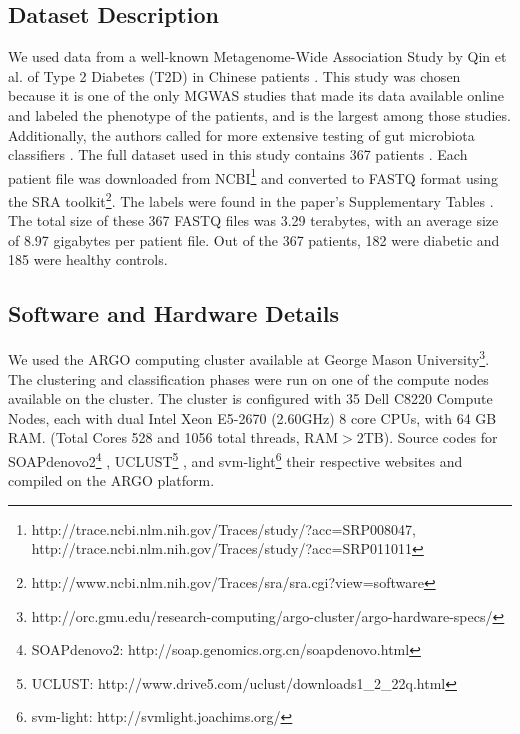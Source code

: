 \subsection{Dataset Description}

We used data from a well-known Metagenome-Wide Association Study by Qin et al. of Type 2 Diabetes (T2D) in Chinese patients \cite{qin041012}. This study was chosen because it is one of the only MGWAS studies that made its data available online and labeled the phenotype of the patients, and is the largest among those studies. Additionally, the authors called for more extensive testing of gut microbiota classifiers \cite{qin041012}. The full dataset used in this study contains 367 patients \cite{qin041012}. Each patient file was downloaded from NCBI\footnote{http://trace.ncbi.nlm.nih.gov/Traces/study/?acc=SRP008047, http://trace.ncbi.nlm.nih.gov/Traces/study/?acc=SRP011011}
and converted to FASTQ format using the SRA toolkit\footnote{http://www.ncbi.nlm.nih.gov/Traces/sra/sra.cgi?view=software}.
The labels were found in the paper's Supplementary Tables \cite{qin041012}. The total size of these 367 FASTQ files was 3.29 terabytes, with an average size of 8.97 gigabytes per patient file. Out of the 367 patients, 182 were diabetic and 185 were healthy controls. 

\subsection{Software and Hardware Details}
We used the ARGO computing cluster available at George Mason University\footnote{http://orc.gmu.edu/research-computing/argo-cluster/argo-hardware-specs/}. The clustering and classification phases were run on one of the compute nodes available on the cluster. The cluster is configured with 35 Dell C8220 Compute Nodes, each with dual Intel Xeon E5-2670 (2.60GHz) 8 core CPUs, with 64 GB RAM. (Total Cores 528 and 1056 total threads, RAM$>$2TB). Source codes for 
SOAPdenovo2\footnote{SOAPdenovo2: http://soap.genomics.org.cn/soapdenovo.html} \cite{luo12}, UCLUST\footnote{UCLUST: http://www.drive5.com/uclust/downloads1\_{}2\_{}22q.html}    \cite{Edgar10}, and svm-light\footnote{svm-light: http://svmlight.joachims.org/} \cite{joachims08}
their respective websites and compiled on the ARGO platform.

